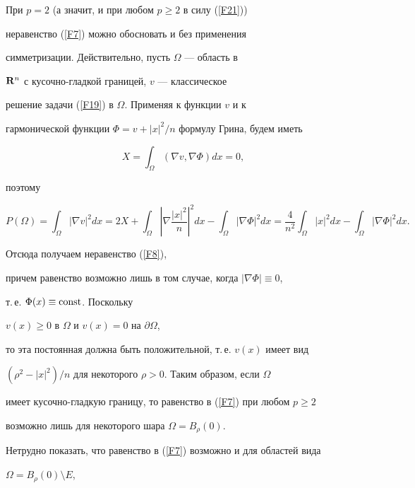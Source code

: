 \begin{notenonum} %


При $p=2$ (а значит, и при любом $p\geq 2$ в силу (\ref{F21}))


неравенство (\ref{F7}) можно обосновать и без применения


симметризации. Действительно, пусть $\Omega$ --- область в


${\bold R}^n$ с кусочно-гладкой границей, $v$ --- классическое


решение задачи (\ref{F19}) в $\Omega$. Применяя к функции $v$ и к


гармонической функции $\Phi =v+|x|^2/n$ формулу Грина, будем иметь


$$


X=\int_\Omega (\nabla v, \nabla \Phi)dx=0,


$$


поэтому


$$


P(\Omega)=\int_\Omega |\nabla v|^2dx =


2X+\int_\Omega \left| {\nabla \frac{|x|^2}{n}} \right|^2dx-


\int_\Omega |\nabla\Phi|^2dx=


\frac{4}{n^2}\int_\Omega |x|^2dx-\int_\Omega |\nabla\Phi|^2dx.


$$


Отсюда получаем неравенство (\ref{F8}),


причем равенство возможно лишь в том случае, когда $|\nabla\Phi|\equiv 0$,


т.\,е. $\Phi(x)\equiv \operatorname{const}$. Поскольку


$v(x)\geq 0$ в $\Omega$ и $v(x)=0$ на $\partial\Omega$, 


то эта постоянная должна быть положительной, т.\,е. $v(x)$ имеет вид


$(\rho^2-|x|^2)/n$ для некоторого $\rho >0$. Таким образом, если $\Omega$ 


имеет кусочно-гладкую границу, то равенство в (\ref{F7}) при любом $p\geq 2$


возможно лишь для некоторого шара $\Omega =B_\rho (0)$.


\end{notenonum}





Нетрудно показать, что равенство в (\ref{F7}) возможно и для областей вида


$\Omega=B_\rho (0)\setminus E$,


